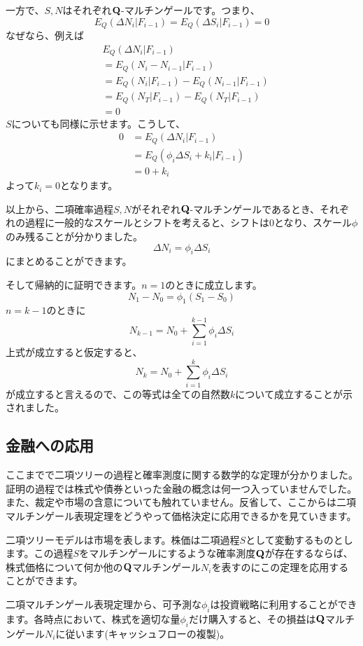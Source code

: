 \documentclass[uplatex,a4j,12pt,dvipdfmx]{jsarticle}
\begin{document}
一方で、$S,N$はそれぞれ${\bf Q}$-マルチンゲールです。つまり、\[E_Q(\Delta N_i | F_{i-1}) = E_Q(\Delta S_i | F_{i-1}) = 0\]なぜなら、例えば\begin{align*}
	 & E_Q(\Delta N_i | F_{i-1})                       \\
	 & = E_Q( N_i - N_{i-1} | F_{i-1})                 \\
	 & = E_Q( N_i | F_{i-1}) - E_Q( N_{i-1} | F_{i-1}) \\
	 & = E_Q( N_T | F_{i-1}) - E_Q( N_T | F_{i-1})     \\
	 & = 0
\end{align*}
$S$についても同様に示せます。こうして、
\begin{align*}
	0 & = E_Q(\Delta N_i | F_{i-1})                  \\
	  & = E_Q(\phi_i \Delta S_{i} + k_{i} | F_{i-1}) \\
	  & = 0 + k_{i}
\end{align*}
よって$k_{i} = 0$となります。

以上から、二項確率過程$S,N$がそれぞれ${\bf Q}$-マルチンゲールであるとき、それぞれの過程に一般的なスケールとシフトを考えると、シフトは0となり、スケール$\phi$のみ残ることが分かりました。\[\Delta N_{i} = \phi_{i} \Delta S_{i}\]にまとめることができます。

そして帰納的に証明できます。$n=1$のときに成立します。\[N_{1} - N_{0} = \phi_{1} ( S_{1} -S_{0} )\]$n=k-1$のときに\[N_{k-1} = N_{0} + \sum^{k-1}_{i=1} \phi_{i} \Delta S_{i}\]上式が成立すると仮定すると、\[N_{k} = N_{0} + \sum^{k}_{i=1} \phi_{i} \Delta S_{i}\]が成立すると言えるので、この等式は全ての自然数$k$について成立することが示されました。

\subsection{金融への応用}
ここまでで二項ツリーの過程と確率測度に関する数学的な定理が分かりました。証明の過程では株式や債券といった金融の概念は何一つ入っていませんでした。また、裁定や市場の含意についても触れていません。反省して、ここからは二項マルチンゲール表現定理をどうやって価格決定に応用できるかを見ていきます。

二項ツリーモデルは市場を表します。株価は二項過程$S$として変動するものとします。この過程$S$をマルチンゲールにするような確率測度${\bf Q}$が存在するならば、株式価格について何か他の${\bf Q}$マルチンゲール$N_{i}$を表すのにこの定理を応用することができます。

二項マルチンゲール表現定理から、可予測な$\phi_{i}$は投資戦略に利用することができます。各時点において、株式を適切な量$\phi_{i}$だけ購入すると、その損益は${\bf Q}$マルチンゲール$N_{i}$に従います(キャッシュフローの複製)。
\end{document}
